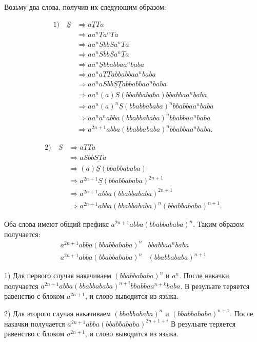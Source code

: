 \documentclass[12pt,a4paper]{article}
\begin{document}
Возьму два слова, получив их следующим образом:

\[
\begin{aligned}
1)\quad \underline{S}
&\Rightarrow a\underline{T}Ta\\
&\Rightarrow aa^{n}\underline{T}a^{n}Ta\\
&\Rightarrow aa^{n}\underline{S}bbSa^{n}Ta\\
&\Rightarrow aa^{n}Sbb\underline{S}a^{n}\underline{T}a\\
&\Rightarrow aa^{n}\underline{S}bbabbaa^{n}baba\\
&\Rightarrow aa^{n}a\underline{T}Tabbabbaa^{n}baba\\
&\Rightarrow aa^{n}aSbb\underline{S}\underline{T}abbabbaa^{n}baba\\
&\Rightarrow aa^{n}(a)\underline{S}(bbabbababa)bbabbaa^{n}baba\\
&\Rightarrow aa^{n}(a)^{n}\underline{S}(bbabbababa)^{n}bbabbaa^{n}baba\\
&\Rightarrow aa^{n}a^{n}abba(bbabbababa)^{n}bbabbaa^{n}baba\\
&\Rightarrow a^{2n+1}abba(bbabbababa)^{n}bbabbaa^{n}baba.
\end{aligned}
\]

\[
\begin{aligned}
2)\quad \underline{S}
&\Rightarrow a\underline{T}Ta\\
&\Rightarrow aSbb\underline{ST}a\\
&\Rightarrow (a)\underline{S}(bbabbababa)\\
&\Rightarrow a^{2n+1}\underline{S}(bbabbababa)^{2n+1}\\
&\Rightarrow a^{2n+1}abba(bbabbababa)^{2n+1}\\
&\Rightarrow a^{2n+1}abba(bbabbababa)^{n}(bbabbababa)^{n+1}.
\end{aligned}
\]

Оба слова имеют общий префикс $a^{2n+1}abba(bbabbababa)^{n}$. Таким образом получается:
\[
\begin{array}{l|l}
a^{2n+1}abba(bbabbababa)^{n} & bbabbaa^{n}baba\\
a^{2n+1}abba(bbabbababa)^{n} & (bbabbababa)^{n+1}
\end{array}
\]

1) Для первого случая накачиваем \((bbabbababa)^n\) и \(a^n\). После накачки получается \(a^{2n+1}abba(bbabbababa)^{n+i}bbabbaa^{n+k}baba\). В резульате теряется равенство с блоком \(a^{2n+1}\), и слово выводится из языка. 

2) Для второго случая накачиваем \((bbabbababa)^n\) и \((bbabbababa)^{n+1}\). После накачки получается \(a^{2n+1}abba(bbabbababa)^{2n+1+i}\) В резульате теряется равенство с блоком \(a^{2n+1}\), и слово выводится из языка.
\end{document}

